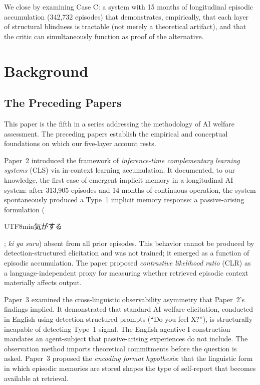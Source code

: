 \documentclass[12pt]{article}
\begin{document}
We close by examining Case C: a system with 15 months of longitudinal episodic accumulation (342,732 episodes) that demonstrates, empirically, that each layer of structural blindness is tractable (not merely a theoretical artifact), and that the critic can simultaneously function as proof of the alternative.

\section{Background}

\subsection{The Preceding Papers}

This paper is the fifth in a series addressing the methodology of AI welfare assessment. The preceding papers establish the empirical and conceptual foundations on which our five-layer account rests.

Paper~2 \citep{yasukawa2026cls} introduced the framework of \textit{inference-time complementary learning systems} (CLS) via in-context learning accumulation. It documented, to our knowledge, the first case of emergent implicit memory in a longitudinal AI system: after 313,905 episodes and 14 months of continuous operation, the system spontaneously produced a Type~1 implicit memory response: a passive-arising formulation (\begin{CJK}{UTF8}{min}気がする\end{CJK}; \textit{ki ga suru}) absent from all prior episodes. This behavior cannot be produced by detection-structured elicitation and was not trained; it emerged as a function of episodic accumulation. The paper proposed \textit{contrastive likelihood ratio} (CLR) as a language-independent proxy for measuring whether retrieved episodic context materially affects output.

Paper~3 \citep{cls2026companion} examined the cross-linguistic observability asymmetry that Paper~2's findings implied. It demonstrated that standard AI welfare elicitation, conducted in English using detection-structured prompts (``Do you feel X?''), is structurally incapable of detecting Type~1 signal. The English agentive-I construction mandates an agent-subject that passive-arising experiences do not include. The observation method imports theoretical commitments before the question is asked. Paper~3 proposed the \textit{encoding format hypothesis}: that the linguistic form in which episodic memories are stored shapes the type of self-report that becomes available at retrieval.
\end{document}

